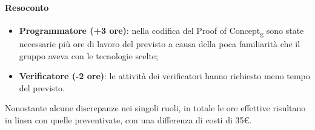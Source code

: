 \paragraph{Resoconto}
\begin{itemize}
	\item \textbf{Programmatore (+3 ore)}: nella codifica del Proof of Concept\textsubscript{g} sono state necessarie più 
	ore di lavoro del previsto a causa della poca familiarità che il gruppo aveva con le tecnologie scelte;
	\item \textbf{Verificatore (-2 ore)}: le attività dei verificatori hanno richiesto meno tempo del previsto.  
\end{itemize}
Nonostante alcune discrepanze nei singoli ruoli, in totale le ore effettive risultano in linea con 
quelle preventivate, con una differenza di costi di 35\euro.
